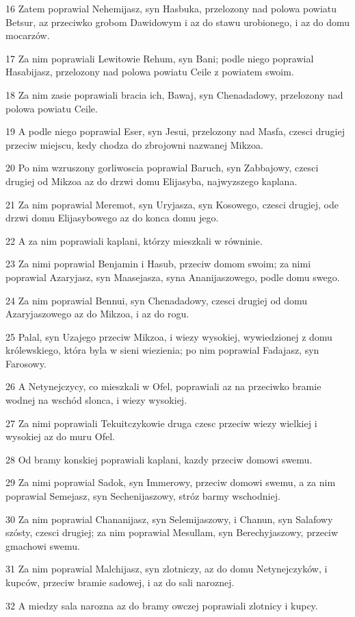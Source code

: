 \par 16 Zatem poprawial Nehemijasz, syn Hasbuka, przelozony nad polowa powiatu Betsur, az przeciwko grobom Dawidowym i az do stawu urobionego, i az do domu mocarzów.
\par 17 Za nim poprawiali Lewitowie Rehum, syn Bani; podle niego poprawial Hasabijasz, przelozony nad polowa powiatu Ceile z powiatem swoim.
\par 18 Za nim zasie poprawiali bracia ich, Bawaj, syn Chenadadowy, przelozony nad polowa powiatu Ceile.
\par 19 A podle niego poprawial Eser, syn Jesui, przelozony nad Masfa, czesci drugiej przeciw miejscu, kedy chodza do zbrojowni nazwanej Mikzoa.
\par 20 Po nim wzruszony gorliwoscia poprawial Baruch, syn Zabbajowy, czesci drugiej od Mikzoa az do drzwi domu Elijasyba, najwyzszego kaplana.
\par 21 Za nim poprawial Meremot, syn Uryjasza, syn Kosowego, czesci drugiej, ode drzwi domu Elijasybowego az do konca domu jego.
\par 22 A za nim poprawiali kaplani, którzy mieszkali w równinie.
\par 23 Za nimi poprawial Benjamin i Hasub, przeciw domom swoim; za nimi poprawial Azaryjasz, syn Maasejasza, syna Ananijaszowego, podle domu swego.
\par 24 Za nim poprawial Bennui, syn Chenadadowy, czesci drugiej od domu Azaryjaszowego az do Mikzoa, i az do rogu.
\par 25 Palal, syn Uzajego przeciw Mikzoa, i wiezy wysokiej, wywiedzionej z domu królewskiego, która byla w sieni wiezienia; po nim poprawial Fadajasz, syn Farosowy.
\par 26 A Netynejczycy, co mieszkali w Ofel, poprawiali az na przeciwko bramie wodnej na wschód slonca, i wiezy wysokiej.
\par 27 Za nimi poprawiali Tekuitczykowie druga czesc przeciw wiezy wielkiej i wysokiej az do muru Ofel.
\par 28 Od bramy konskiej poprawiali kaplani, kazdy przeciw domowi swemu.
\par 29 Za nimi poprawial Sadok, syn Immerowy, przeciw domowi swemu, a za nim poprawial Semejasz, syn Sechenijaszowy, stróz barmy wschodniej.
\par 30 Za nim poprawial Chananijasz, syn Selemijaszowy, i Chanun, syn Salafowy szósty, czesci drugiej; za nim poprawial Mesullam, syn Berechyjaszowy, przeciw gmachowi swemu.
\par 31 Za nim poprawial Malchijasz, syn zlotniczy, az do domu Netynejczyków, i kupców, przeciw bramie sadowej, i az do sali naroznej.
\par 32 A miedzy sala narozna az do bramy owczej poprawiali zlotnicy i kupcy.

